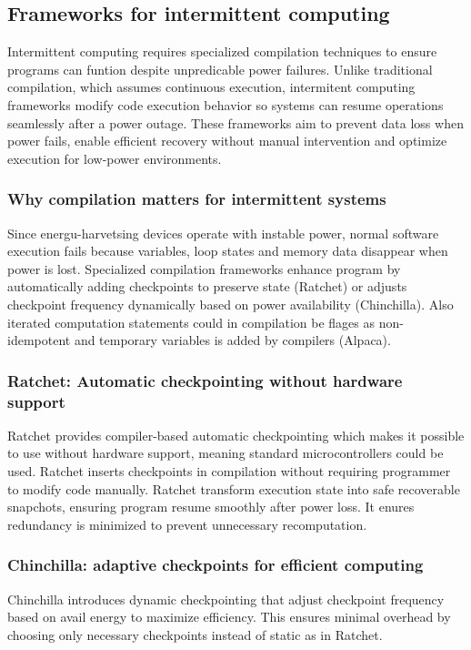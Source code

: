 \documentclass[article,a4paper]{IEEEtran}
\begin{document}
\subsection{Frameworks for intermittent computing}
Intermittent computing requires specialized compilation techniques to ensure programs can funtion despite unpredicable power failures. Unlike traditional compilation, which assumes continuous execution, intermitent computing frameworks modify code execution behavior so systems can resume operations seamlessly after a power outage. These frameworks aim to prevent data loss when power fails, enable efficient recovery without manual intervention and optimize execution for low-power environments. 
\subsubsection{Why compilation matters for intermittent systems}
Since energu-harvetsing devices operate with instable power, normal software execution fails because variables, loop states and memory data disappear when power is lost. Specialized compilation frameworks enhance program by automatically adding checkpoints to preserve state (Ratchet) or adjusts checkpoint frequency dynamically based on power availability (Chinchilla). Also iterated computation statements could in compilation be flages as non-idempotent and temporary variables is added by compilers (Alpaca). 
\subsubsection{Ratchet: Automatic checkpointing without hardware support}
Ratchet provides compiler-based automatic checkpointing which makes it possible to use without hardware support, meaning standard microcontrollers could be used. Ratchet inserts checkpoints in compilation without requiring programmer to modify code manually.
\newline\newline
Ratchet transform execution state into safe recoverable snapchots, ensuring program resume smoothly after power loss. It enures redundancy is minimized to prevent unnecessary recomputation. 
\subsubsection{Chinchilla: adaptive checkpoints for efficient computing}
Chinchilla introduces dynamic checkpointing that adjust checkpoint frequency based on avail energy to maximize efficiency. This ensures minimal overhead by choosing only necessary checkpoints instead of static as in Ratchet. 
\end{document}

